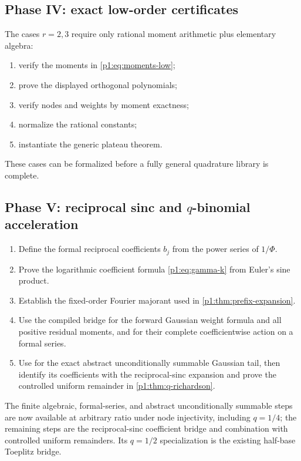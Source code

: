 \documentclass[11pt]{article}
\numberwithin{equation}{section}
\theoremstyle{definition}
\theoremstyle{remark}
\begin{document}
\subsection{Phase IV: exact low-order certificates}

The cases $r=2,3$ require only rational moment arithmetic plus elementary algebra:
\begin{enumerate}
\item verify the moments in \eqref{p1:eq:moments-low};
\item prove the displayed orthogonal polynomials;
\item verify nodes and weights by moment exactness;
\item normalize the rational constants;
\item instantiate the generic plateau theorem.
\end{enumerate}
These cases can be formalized before a fully general quadrature library is complete.

\subsection{Phase V: reciprocal sinc and $q$-binomial acceleration}

\begin{enumerate}
\item Define the formal reciprocal coefficients $b_j$ from the power series of $1/\Phi$.
\item Prove the logarithmic coefficient formula \eqref{p1:eq:gamma-k} from Euler's sine product.
\item Establish the fixed-order Fourier majorant used in \cref{p1:thm:prefix-expansion}.
\item Use the compiled  bridge for the
      forward Gaussian weight formula and all positive residual moments, and
       for their complete coefficientwise
      action on a formal series.
\item Use  for the exact abstract
      unconditionally summable Gaussian tail, then identify its coefficients
      with the reciprocal-sinc expansion and prove the controlled uniform
      remainder in \cref{p1:thm:q-richardson}.
\end{enumerate}
The finite algebraic, formal-series, and abstract unconditionally summable
steps are now available at arbitrary ratio under node injectivity, including
\(q=1/4\); the remaining steps are the reciprocal-sinc coefficient bridge and
combination with controlled uniform remainders.  Its
\(q=1/2\) specialization is the existing half-base Toeplitz bridge.
\end{document}
